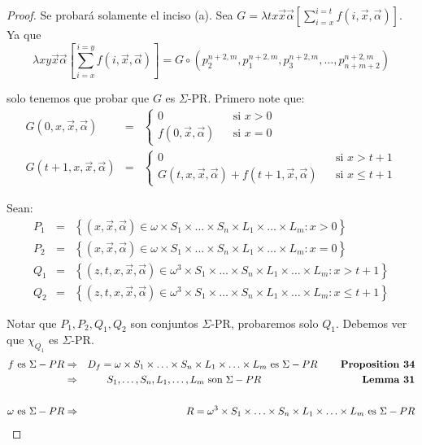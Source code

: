   \begin{proof}
    \PN Se probará solamente el inciso (a).
    \PN Sea $G = \lambda tx\vec{x}\vec{\alpha} \left[\sum_{i=x}^{i=t} f(i,\vec{x},\vec{\alpha})\right]$. Ya que
    \[
      \lambda xy\vec{x}\vec{\alpha}\left[\sum_{i=x}^{i=y} f(i, \vec{x}, \vec{\alpha})\right] = G \circ \left(
      p_{2}^{n+2,m}, p_{1}^{n+2,m}, p_{3}^{n+2,m}, \dotsc, p_{n+m+2}^{n+2,m}\right)
    \]

    \PN solo tenemos que probar que $G$ es $\Sigma$-PR. Primero note que:
    \begin{eqnarray*}
      G(0,x,\vec{x},\vec{\alpha}) &=& \left\{
        \begin{array}{lll}
          0 && \text{si } x > 0 \\
          f(0,\vec{x},\vec{\alpha}) && \text{si } x = 0
        \end{array}\right. \\
      G(t+1,x,\vec{x},\vec{\alpha}) &=& \left\{
        \begin{array}{lll}
          0 && \text{si } x > t+1 \\
          G(t,x,\vec{x},\vec{\alpha}) + f(t+1,\vec{x},\vec{\alpha}) && \text{si } x \leq t+1
        \end{array} \right.
    \end{eqnarray*}

    \PN Sean:
    \begin{eqnarray*}
      P_{1} &=& \left\{(x,\vec{x},\vec{\alpha}) \in \omega \times S_{1} \times \dotsc \times S_{n} \times L_{1} \times
        \dotsc \times L_{m}: x > 0 \right\} \\
      P_{2} &=& \left\{(x,\vec{x},\vec{\alpha}) \in \omega \times S_{1} \times \dotsc \times S_{n} \times L_{1} \times
        \dotsc \times L_{m}: x = 0 \right\} \\
      Q_{1} &=& \left\{(z,t,x,\vec{x},\vec{\alpha}) \in \omega^{3} \times S_{1} \times \dotsc \times S_{n} \times L_{1}
        \times \dotsc \times L_{m}: x > t+1\right\} \\
      Q_{2} &=& \left\{(z,t,x,\vec{x},\vec{\alpha}) \in \omega^{3} \times S_{1} \times \dotsc \times S_{n} \times L_{1}
        \times \dotsc \times L_{m}: x \leq t+1\right\}
    \end{eqnarray*}

    \PN Notar que $P_{1}, P_{2}, Q_{1}, Q_{2}$ son conjuntos $\Sigma$-PR, probaremos solo $Q_{1}$. Debemos ver que
    $\chi_{Q_{1}}$ es $\Sigma$-PR.
    \begin{eqnarray*}
      f \text{ es } \Sigma-PR &\Rightarrow& D_{f} = \omega \times S_{1} \times \dotsc \times S_{n} \times L_{1} \times
        \dotsc \times L_{m} \text{ es } \Sigma-PR \qquad\; \text{\textbf{Proposition 34}} \\
      &\Rightarrow& S_{1}, \dotsc, S_{n}, L_{1}, \dotsc, L_{m} \text{ son  } \Sigma-PR \qquad\qquad\qquad\qquad\qquad
        \text{\textbf{Lemma 31}} \\
      \\
      \omega \text{ es } \Sigma-PR &\Rightarrow& R = \omega^{3} \times S_{1} \times \dotsc \times S_{n} \times L_{1}
        \times \dotsc \times L_{m} \text{ es } \Sigma-PR
    \end{eqnarray*}


\end{proof}
